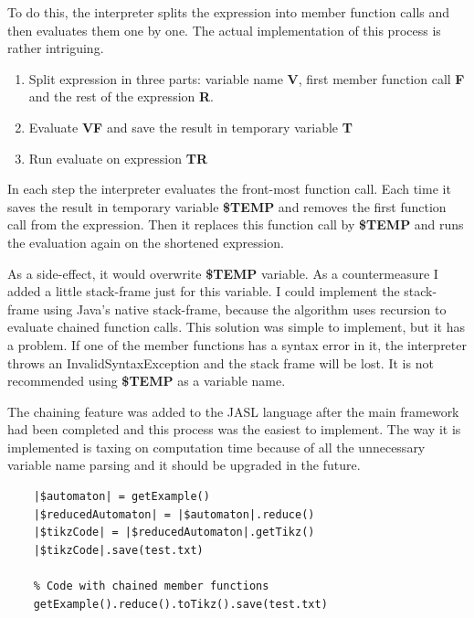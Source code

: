 \documentclass{ctuthesis}
\begin{document}
To do this, the interpreter splits the expression into member function calls and then evaluates them one by one. The actual implementation of this process is rather intriguing. 
\begin{enumerate}
	\item Split expression in three parts: variable name \textbf{V}, first member function call \textbf{F} and the rest of the expression \textbf{R}.
	\item Evaluate \textbf{VF} and save the result in temporary variable \textbf{T}
	\item Run evaluate on expression \textbf{TR}
\end{enumerate}


In each step the interpreter evaluates the front-most function call. Each time it saves the result in temporary variable \textbf{\$TEMP} and removes the first function call from the expression. Then it replaces this function call by \textbf{\$TEMP} and runs the evaluation again on the shortened expression. 

As a side-effect, it would overwrite \textbf{\$TEMP} variable. As a countermeasure I added a little stack-frame just for this variable. I could implement the stack-frame using Java's native stack-frame, because the algorithm uses recursion to evaluate chained function calls. This solution was simple to implement, but it has a problem. If one of the member functions has a syntax error in it, the interpreter throws an InvalidSyntaxException and the stack frame will be lost. It is not recommended using \textbf{\$TEMP} as a variable name. 

The chaining feature was added to the JASL language after the main framework had been completed and this process was the easiest to implement. The way it is implemented is taxing on computation time because of all the unnecessary variable name parsing and it should be upgraded in the future. 

\begin{minipage}{\linewidth}
\begin{lstlisting}[language = JASL]
	% Code without chained member function calls
	|$automaton| = getExample()
	|$reducedAutomaton| = |$automaton|.reduce()
	|$tikzCode| = |$reducedAutomaton|.getTikz()
	|$tikzCode|.save(test.txt)
	
	% Code with chained member functions
	getExample().reduce().toTikz().save(test.txt)
\end{lstlisting}
\end{minipage}
\end{document}
